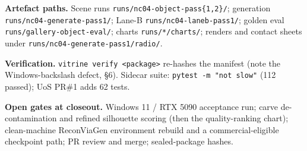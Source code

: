 \textbf{Artefact paths.} Scene runs \texttt{runs/nc04-object-pass\{1,2\}/}; generation
\texttt{runs/nc04-generate-pass1/}; Lane-B \texttt{runs/nc04-laneb-pass1/}; golden eval
\texttt{runs/gallery-object-eval/}; charts \texttt{runs/*/charts/}; renders and contact sheets under
\texttt{runs/nc04-generate-pass1/radio/}.

\textbf{Verification.} \texttt{vitrine verify <package>} re-hashes the manifest (note the
Windows-backslash defect, \S6). Sidecar suite: \texttt{pytest -m "not slow"} (112 passed);
UoS PR\#1 adds 62 tests.

\textbf{Open gates at closeout.} Windows 11 / RTX 5090 acceptance run; carve de-contamination and
refined silhouette scoring (then the quality-ranking chart); clean-machine ReconViaGen environment
rebuild and a commercial-eligible checkpoint path; PR review and merge; sealed-package hashes.
